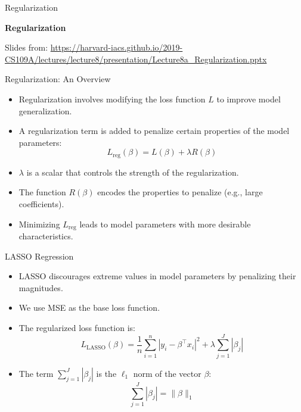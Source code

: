 \begin{frame}{Regularization}

    \centering
    \Huge{\textbf{Regularization}}

    \vfill

    \small{Slides from: \url{https://harvard-iacs.github.io/2019-CS109A/lectures/lecture8/presentation/Lecture8a_Regularization.pptx}}

\end{frame}

\begin{frame}{Regularization: An Overview}
    \begin{itemize}
        \item Regularization involves modifying the loss function $L$ to improve model generalization.
        \item A regularization term is added to penalize certain properties of the model parameters:
        \[
            L_{\text{reg}}(\beta) = L(\beta) + \lambda R(\beta)
        \]
        \item $\lambda$ is a scalar that controls the strength of the regularization.
        \item The function $R(\beta)$ encodes the properties to penalize (e.g., large coefficients).
        \item Minimizing $L_{\text{reg}}$ leads to model parameters with more desirable characteristics.
    \end{itemize}
\end{frame}


\begin{frame}[allowframebreaks]{LASSO Regression}
    \begin{itemize}
        \item LASSO discourages extreme values in model parameters by penalizing their magnitudes.
        \item We use MSE as the base loss function.
        \item The regularized loss function is:
        \[
            L_{\text{LASSO}}(\beta) = \frac{1}{n} \sum_{i=1}^{n} \left| y_i - \beta^\top x_i \right|^2 + \lambda \sum_{j=1}^{J} |\beta_j|
        \]
        \item The term \( \sum_{j=1}^{J} |\beta_j| \) is the \( \ell_1 \) norm of the vector \( \beta \):
        \[
            \sum_{j=1}^{J} |\beta_j| = \|\beta\|_1
        \]
    \end{itemize}
\end{frame}

